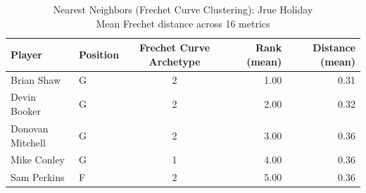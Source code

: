 \begin{table}[t]
\caption*{
{\fontsize{20}{25} Nearest Neighbors (Frechet Curve Clustering): Jrue Holiday\fontsize{12}{15}\selectfont } \\ 
{\fontsize{14}{17}\selectfont  Mean Frechet distance across 16 metrics\fontsize{12}{15}\selectfont }
} 
\fontsize{12.0pt}{14.0pt}\selectfont
\begin{tabular*}{\linewidth}{@{\extracolsep{\fill}}llcrr}
\toprule
Player & Position & Frechet Curve Archetype & Rank (mean) & Distance (mean) \\ 
\midrule\addlinespace[2.5pt]
Brian Shaw & G & 2 & 1.00 & 0.31 \\ 
Devin Booker & G & 2 & 2.00 & 0.32 \\ 
Donovan Mitchell & G & 2 & 3.00 & 0.36 \\ 
Mike Conley & G & 1 & 4.00 & 0.36 \\ 
Sam Perkins & F & 2 & 5.00 & 0.36 \\ 
\bottomrule
\end{tabular*}
\end{table}

